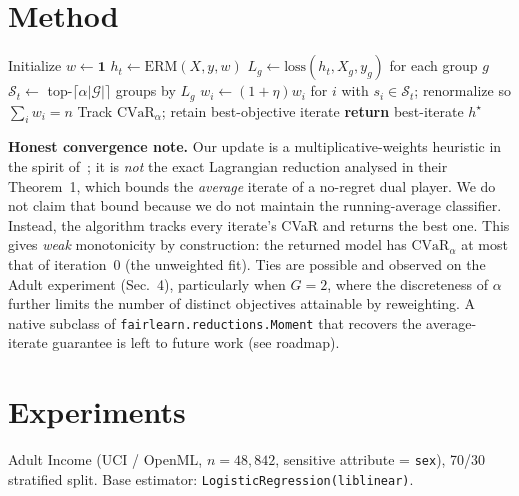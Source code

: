 \documentclass[11pt]{article}
\begin{document}
\section{Method}
\begin{algorithm}[h]
\caption{CVaR reduction (cost-sensitive reweighting)}
\begin{algorithmic}[1]
\STATE Initialize $w \gets \mathbf{1}$
  \STATE $h_t \gets \mathrm{ERM}(X, y, w)$
  \STATE $L_g \gets \mathrm{loss}(h_t, X_g, y_g)$ for each group $g$
  \STATE $\mathcal{S}_t \gets$ top-$\lceil \alpha |\mathcal{G}| \rceil$ groups by $L_g$
  \STATE $w_i \gets (1 + \eta) w_i$ for $i$ with $s_i \in \mathcal{S}_t$;
         renormalize so $\sum_i w_i = n$
  \STATE Track $\mathrm{CVaR}_\alpha$; retain best-objective iterate
\ENDFOR
\STATE \textbf{return} best-iterate $h^\star$
\end{algorithmic}
\end{algorithm}

\noindent\textbf{Honest convergence note.} Our update is a multiplicative-weights
heuristic in the spirit of~\citet{agarwal2018reductions}; it is \emph{not}
the exact Lagrangian reduction analysed in their Theorem~1, which bounds the
\emph{average} iterate of a no-regret dual player. We do not claim that bound
because we do not maintain the running-average classifier. Instead, the
algorithm tracks every iterate's CVaR and returns the best one. This gives
\emph{weak} monotonicity by construction: the returned model has
$\mathrm{CVaR}_\alpha$ at most that of iteration~0 (the unweighted fit).
Ties are possible and observed on the Adult experiment (Sec.~4), particularly
when $G = 2$, where the discreteness of $\alpha$ further limits the number of
distinct objectives attainable by reweighting. A native subclass of
\texttt{fairlearn.reductions.Moment} that recovers the average-iterate guarantee
is left to future work (see roadmap).

\section{Experiments}
Adult Income (UCI / OpenML, $n = 48{,}842$, sensitive attribute = \texttt{sex}),
70/30 stratified split. Base estimator: \texttt{LogisticRegression(liblinear)}.
\end{document}
